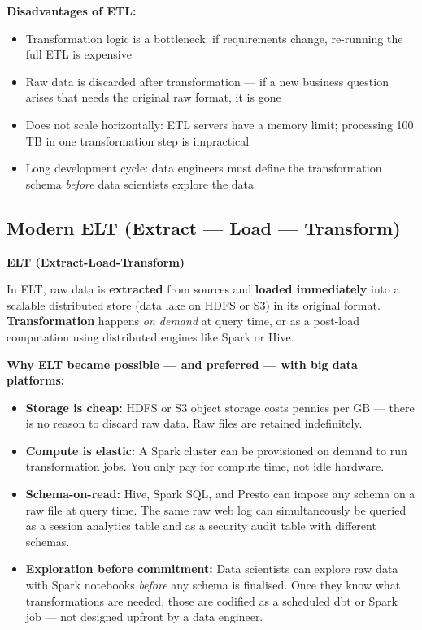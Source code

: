 \documentclass[12pt,a4paper]{article}
\newcommand{\defbox}[2]{%
  \noindent
  \colorbox{PUNavy!12}{%
    \begin{minipage}{\dimexpr\linewidth-2\fboxsep}
      \vspace{4pt}\textbf{\textcolor{PUNavy}{#1}}\par\vspace{2pt}
      #2\vspace{4pt}
    \end{minipage}%
  }\par\vspace{6pt}%
}
\begin{document}
\textbf{Disadvantages of ETL:}
\begin{itemize}[leftmargin=1.8em, nosep]
  \item Transformation logic is a bottleneck: if requirements change, re-running the full ETL is expensive
  \item Raw data is discarded after transformation --- if a new business question arises that needs the original raw format, it is gone
  \item Does not scale horizontally: ETL servers have a memory limit; processing 100 TB in one transformation step is impractical
  \item Long development cycle: data engineers must define the transformation schema \textit{before} data scientists explore the data
\end{itemize}

\subsection{Modern ELT (Extract --- Load --- Transform)}

\defbox{ELT (Extract-Load-Transform)}{In ELT, raw data is \textbf{extracted} from sources and \textbf{loaded immediately} into a scalable distributed store (data lake on HDFS or S3) in its original format.  \textbf{Transformation} happens \textit{on demand} at query time, or as a post-load computation using distributed engines like Spark or Hive.}

\textbf{Why ELT became possible --- and preferred --- with big data platforms:}

\begin{itemize}[leftmargin=1.8em, itemsep=4pt]
  \item \textbf{Storage is cheap:}  HDFS or S3 object storage costs pennies per GB --- there is no reason to discard raw data.  Raw files are retained indefinitely.
  \item \textbf{Compute is elastic:}  A Spark cluster can be provisioned on demand to run transformation jobs.  You only pay for compute time, not idle hardware.
  \item \textbf{Schema-on-read:}  Hive, Spark SQL, and Presto can impose any schema on a raw file at query time.  The same raw web log can simultaneously be queried as a session analytics table and as a security audit table with different schemas.
  \item \textbf{Exploration before commitment:}  Data scientists can explore raw data with Spark notebooks \textit{before} any schema is finalised.  Once they know what transformations are needed, those are codified as a scheduled dbt or Spark job --- not designed upfront by a data engineer.
\end{itemize}
\end{document}
